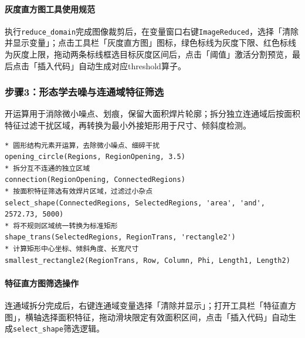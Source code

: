 \documentclass[UTF8,a4paper,12pt]{ctexart}
\begin{document}
\paragraph{灰度直方图工具使用规范}
执行\texttt{reduce\_domain}完成图像裁剪后，在变量窗口右键\texttt{ImageReduced}，选择「清除并显示变量」；点击工具栏「灰度直方图」图标，绿色标线为灰度下限、红色标线为灰度上限，拖动两条标线框选目标灰度区间后，点击「阈值」激活分割预览，最后点击「插入代码」自动生成对应threshold算子。

\subsubsection{步骤3：形态学去噪与连通域特征筛选}
开运算用于消除微小噪点、划痕，保留大面积焊片轮廓；拆分独立连通域后按面积特征过滤干扰区域，再转换为最小外接矩形用于尺寸、倾斜度检测。
\begin{lstlisting}[style=halconstyle, caption={形态学开运算 + 连通域特征筛选}]
* 圆形结构元素开运算，去除微小噪点、细碎干扰
opening_circle(Regions, RegionOpening, 3.5)
* 拆分互不连通的独立区域
connection(RegionOpening, ConnectedRegions)
* 按面积特征筛选有效焊片区域，过滤过小杂点
select_shape(ConnectedRegions, SelectedRegions, 'area', 'and', 2572.73, 5000)
* 将不规则区域统一转换为标准矩形
shape_trans(SelectedRegions, RegionTrans, 'rectangle2')
* 计算矩形中心坐标、倾斜角度、长宽尺寸
smallest_rectangle2(RegionTrans, Row, Column, Phi, Length1, Length2)
\end{lstlisting}

\paragraph{特征直方图筛选操作}
连通域拆分完成后，右键连通域变量选择「清除并显示」；打开工具栏「特征直方图」，横轴选择面积特征，拖动滑块限定有效面积区间，点击「插入代码」自动生成\texttt{select\_shape}筛选逻辑。
\end{document}
